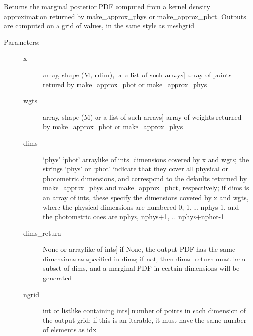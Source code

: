 \documentclass[letterpaper,10pt,english]{sphinxmanual}
\begin{document}
\begin{fulllineitems}
\begin{fulllineitems}
\begin{description}
\begin{description}
\end{description}

\end{description}

\end{fulllineitems}


\begin{fulllineitems}
\label{\detokenize{cluster_slug:slugpy.cluster_slug.cluster_slug.mpdf_approx}}
Returns the marginal posterior PDF computed from a kernel
density approximation returned by make\_approx\_phys or
make\_approx\_phot. Outputs are computed on a grid of values, in
the same style as meshgrid.
\begin{description}
\item[{Parameters:}] \leavevmode\begin{description}
\item[{x}] \leavevmode{[}array, shape (M, ndim), or a list of such arrays{]}
array of points retured by make\_approx\_phot or
make\_approx\_phys

\item[{wgts}] \leavevmode{[}array, shape (M) or a list of such arrays{]}
array of weights returned by make\_approx\_phot or
make\_approx\_phys

\item[{dims}] \leavevmode{[}‘phys’ \textbar{} ‘phot’ \textbar{} arraylike of ints{]}
dimensions covered by x and wgts; the strings ‘phys’ or
‘phot’ indicate that they cover all physical or
photometric dimensions, and correspond to the defaults
returned by make\_approx\_phys and make\_approx\_phot,
respectively; if dims is an array of ints, these specify
the dimensions covered by x and wgts, where the
physical dimensions are numbered 0, 1, … nphys-1, and
the photometric ones are nphys, nphys+1,
… nphys+nphot-1

\item[{dims\_return}] \leavevmode{[}None or arraylike of ints{]}
if None, the output PDF has the same dimensions as
specified in dims; if not, then dims\_return must be a
subset of dims, and a marginal PDF in certain dimensions
will be generated

\item[{ngrid}] \leavevmode{[}int or listlike containing ints{]}
number of points in each dimension of the output grid;
if this is an iterable, it must have the same number of
elements as idx


\end{description}
\end{description}
\end{fulllineitems}
\end{fulllineitems}
\end{document}

